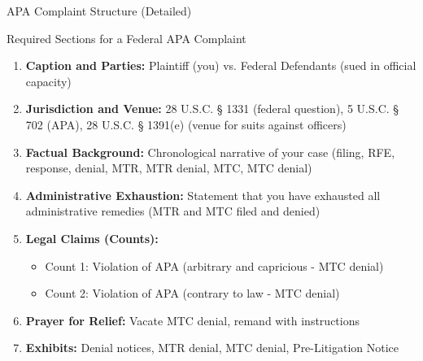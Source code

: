 \documentclass[11pt]{beamer}
\begin{document}
	\begin{frame}{APA Complaint Structure (Detailed)}
		\scriptsize
		\begin{block}{Required Sections for a Federal APA Complaint}
			\begin{enumerate}
				\item \textbf{Caption and Parties:} Plaintiff (you) vs. Federal Defendants (sued in official capacity)
				\item \textbf{Jurisdiction and Venue:} 28 U.S.C. § 1331 (federal question), 5 U.S.C. § 702 (APA), 28 U.S.C. § 1391(e) (venue for suits against officers)
				\item \textbf{Factual Background:} Chronological narrative of your case (filing, RFE, response, denial, MTR, MTR denial, MTC, MTC denial)
				\item \textbf{Administrative Exhaustion:} Statement that you have exhausted all administrative remedies (MTR and MTC filed and denied)
				\item \textbf{Legal Claims (Counts):} 
				\begin{itemize}
					\item Count 1: Violation of APA (arbitrary and capricious - MTC denial)
					\item Count 2: Violation of APA (contrary to law - MTC denial)
				\end{itemize}
				\item \textbf{Prayer for Relief:} Vacate MTC denial, remand with instructions
				\item \textbf{Exhibits:} Denial notices, MTR denial, MTC denial, Pre-Litigation Notice
			\end{enumerate}
		\end{block}
	\end{frame}
	
\end{document}
